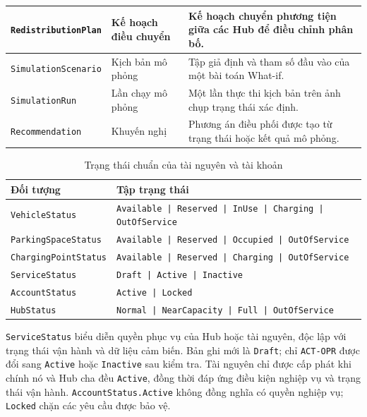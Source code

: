 \begin{longtable}{|L{44mm}|L{34mm}|L{62mm}|}
  \hline
  \texttt{RedistributionPlan} & Kế hoạch điều chuyển & Kế hoạch chuyển phương tiện giữa các Hub để điều chỉnh phân bố.\\
  \hline
  \texttt{SimulationScenario} & Kịch bản mô phỏng & Tập giả định và tham số đầu vào của một bài toán What-if.\\
  \hline
  \texttt{SimulationRun} & Lần chạy mô phỏng & Một lần thực thi kịch bản trên ảnh chụp trạng thái xác định.\\
  \hline
  \texttt{Recommendation} & Khuyến nghị & Phương án điều phối được tạo từ trạng thái hoặc kết quả mô phỏng.\\
  \hline
\end{longtable}
\endgroup

\begin{table}[htbp]
  \centering
  \caption{Trạng thái chuẩn của tài nguyên và tài khoản}
  \label{tab:resource-statuses}
  \small
  \begin{tabularx}{\textwidth}{|L{47mm}|Y|}
    \hline
    \centering\arraybackslash\textbf{Đối tượng} & \centering\arraybackslash\textbf{Tập trạng thái}\\
    \hline
    \texttt{VehicleStatus} & \texttt{Available | Reserved | InUse | Charging | OutOfService}\\
    \hline
    \texttt{ParkingSpaceStatus} & \texttt{Available | Reserved | Occupied | OutOfService}\\
    \hline
    \texttt{ChargingPointStatus} & \texttt{Available | Reserved | Charging | OutOfService}\\
    \hline
    \texttt{ServiceStatus} & \texttt{Draft | Active | Inactive}\\
    \hline
    \texttt{AccountStatus} & \texttt{Active | Locked}\\
    \hline
    \texttt{HubStatus} & \texttt{Normal | NearCapacity | Full | OutOfService}\\
    \hline
  \end{tabularx}
\end{table}

\noindent \texttt{ServiceStatus} biểu diễn quyền phục vụ của Hub hoặc tài nguyên, độc lập với trạng thái vận hành và dữ liệu cảm biến. Bản ghi mới là \texttt{Draft}; chỉ \texttt{ACT-OPR} được đổi sang \texttt{Active} hoặc \texttt{Inactive} sau kiểm tra. Tài nguyên chỉ được cấp phát khi chính nó và Hub cha đều \texttt{Active}, đồng thời đáp ứng điều kiện nghiệp vụ và trạng thái vận hành. \texttt{AccountStatus.Active} không đồng nghĩa có quyền nghiệp vụ; \texttt{Locked} chặn các yêu cầu được bảo vệ.

